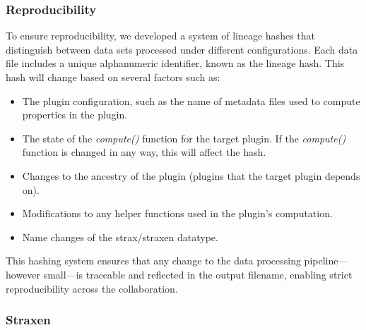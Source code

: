 \subsubsection*{Reproducibility}

To ensure reproducibility, we developed a system of lineage hashes that distinguish between data sets processed under different configurations. Each data file includes a unique alphanumeric identifier, known as the lineage hash. This hash will change based on several factors such as:

\begin{itemize}
    \item The plugin configuration, such as the name of metadata files used to compute properties in the plugin.
    \item The state of the \textit{compute()} function for the target plugin. If the \textit{compute()} function is changed in any way, this will affect the hash.
    \item Changes to the ancestry of the plugin (plugins that the target plugin depends on).
    \item Modifications to any helper functions used in the plugin’s computation.
    \item Name changes of the strax/straxen datatype.
\end{itemize}

This hashing system ensures that any change to the data processing pipeline—however small—is traceable and reflected in the output filename, enabling strict reproducibility across the collaboration.


\subsubsection{Straxen}

